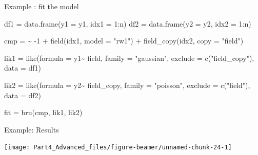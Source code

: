 \documentclass[
  ignorenonframetext,
]{beamer}
\newenvironment{Shaded}{\begin{snugshade}}{\end{snugshade}}
\newcommand{\AttributeTok}[1]{\textcolor[rgb]{0.77,0.63,0.00}{#1}}
\newcommand{\DecValTok}[1]{\textcolor[rgb]{0.00,0.00,0.81}{#1}}
\newcommand{\ErrorTok}[1]{\textcolor[rgb]{0.64,0.00,0.00}{\textbf{#1}}}
\newcommand{\FunctionTok}[1]{\textcolor[rgb]{0.00,0.00,0.00}{#1}}
\newcommand{\NormalTok}[1]{#1}
\newcommand{\OtherTok}[1]{\textcolor[rgb]{0.56,0.35,0.01}{#1}}
\newcommand{\SpecialCharTok}[1]{\textcolor[rgb]{0.00,0.00,0.00}{#1}}
\newcommand{\StringTok}[1]{\textcolor[rgb]{0.31,0.60,0.02}{#1}}
\begin{document}
\begin{frame}[fragile]{Example : fit the model}
\protect\hypertarget{example-fit-the-model-2}{}
\footnotesize

\begin{Shaded}
\begin{Highlighting}[]
\NormalTok{df1 }\OtherTok{=} \FunctionTok{data.frame}\NormalTok{(}\AttributeTok{y1 =}\NormalTok{ y1, }\AttributeTok{idx1 =}  \DecValTok{1}\SpecialCharTok{:}\NormalTok{n)}
\NormalTok{df2 }\OtherTok{=} \FunctionTok{data.frame}\NormalTok{(}\AttributeTok{y2 =}\NormalTok{ y2, }\AttributeTok{idx2 =}  \DecValTok{1}\SpecialCharTok{:}\NormalTok{n)}

\NormalTok{cmp }\OtherTok{=} \ErrorTok{\textasciitilde{}} \SpecialCharTok{{-}}\DecValTok{1} \SpecialCharTok{+} 
  \FunctionTok{field}\NormalTok{(idx1, }\AttributeTok{model =} \StringTok{"rw1"}\NormalTok{) }\SpecialCharTok{+} 
  \FunctionTok{field\_copy}\NormalTok{(idx2, }\AttributeTok{copy =} \StringTok{"field"}\NormalTok{)}

\NormalTok{lik1 }\OtherTok{=} \FunctionTok{like}\NormalTok{(}\AttributeTok{formula  =}\NormalTok{ y1}\SpecialCharTok{\textasciitilde{}}\NormalTok{ field,}
            \AttributeTok{family =} \StringTok{"gaussian"}\NormalTok{,}
            \AttributeTok{exclude =} \FunctionTok{c}\NormalTok{(}\StringTok{"field\_copy"}\NormalTok{),}
            \AttributeTok{data =}\NormalTok{ df1)}

\NormalTok{lik2 }\OtherTok{=} \FunctionTok{like}\NormalTok{(}\AttributeTok{formula  =}\NormalTok{ y2}\SpecialCharTok{\textasciitilde{}}\NormalTok{ field\_copy,}
            \AttributeTok{family =} \StringTok{"poisson"}\NormalTok{,}
            \AttributeTok{exclude =} \FunctionTok{c}\NormalTok{(}\StringTok{"field"}\NormalTok{),}
            \AttributeTok{data =}\NormalTok{ df2)}

\NormalTok{fit }\OtherTok{=} \FunctionTok{bru}\NormalTok{(cmp, }
\NormalTok{          lik1,}
\NormalTok{          lik2)}
\end{Highlighting}
\end{Shaded}

\normalsize
\end{frame}

\begin{frame}{Example: Results}
\protect\hypertarget{example-results}{}
\begin{center}\texttt{[image: Part4\_Advanced\_files/figure-beamer/unnamed-chunk-24-1]} \end{center}
\end{frame}
\end{document}
